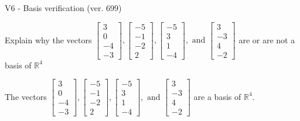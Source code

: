 \begin{exercise}
  \begin{exerciseTitle}V6 - Basis verification (ver. 699)\end{exerciseTitle}
  \begin{exerciseStatement}
    Explain why the vectors \(\left[\begin{array}{r}
3 \\
0 \\
-4 \\
-3
\end{array}\right] , \left[\begin{array}{r}
-5 \\
-1 \\
-2 \\
2
\end{array}\right] , \left[\begin{array}{r}
-5 \\
3 \\
1 \\
-4
\end{array}\right] , \text{ and } \left[\begin{array}{r}
3 \\
-3 \\
4 \\
-2
\end{array}\right]\) are or are not a basis of \(\mathbb{R}^4\)	


  \end{exerciseStatement}
  \begin{exerciseAnswer}
   The vectors \(\left[\begin{array}{r}
3 \\
0 \\
-4 \\
-3
\end{array}\right] , \left[\begin{array}{r}
-5 \\
-1 \\
-2 \\
2
\end{array}\right] , \left[\begin{array}{r}
-5 \\
3 \\
1 \\
-4
\end{array}\right] , \text{ and } \left[\begin{array}{r}
3 \\
-3 \\
4 \\
-2
\end{array}\right]\) 
  	 are  a basis of \(\mathbb{R}^4\).
  


  \end{exerciseAnswer}
\end{exercise}